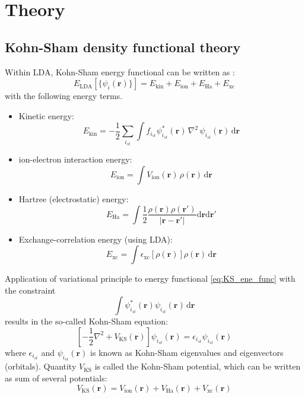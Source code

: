 \section{Theory}

\subsection{Kohn-Sham density functional theory}

Within LDA, Kohn-Sham energy functional can be written as \cite{Kohn1965}:
\begin{equation}
E_{\mathrm{LDA}}\left[\{\psi_{i}(\mathbf{r})\}\right] =
E_{\mathrm{kin}} + E_{\mathrm{ion}} + E_{\mathrm{Ha}} + E_{\mathrm{xc}}
\label{eq:KS_ene_func}
\end{equation}
with the following energy terms.
\begin{itemize}
\item Kinetic energy:
\begin{equation}
E_{\mathrm{kin}} = -\frac{1}{2}\sum_{i_{st}}
\int f_{i_{st}}
\psi_{i_{st}}^{*}(\mathbf{r})\,\nabla^2\,\psi_{i_{st}}(\mathbf{r})
\,\mathrm{d}\mathbf{r}
\end{equation}
%
\item ion-electron interaction energy:
\begin{equation}
E_{\mathrm{ion}} = \int V_{\mathrm{ion}}(\mathbf{r})\, \rho(\mathbf{r})\,
\mathrm{d}\mathbf{r}
\end{equation}
%
\item Hartree (electrostatic) energy:
\begin{equation}
E_{\mathrm{Ha}} = \int \frac{1}{2}
\dfrac{\rho(\mathbf{r})\rho(\mathbf{r}')}
{\left|\mathbf{r} - \mathbf{r}'\right|}
\mathrm{d}\mathbf{r}\mathrm{d}\mathbf{r}'
\end{equation}
%
\item Exchange-correlation energy (using LDA):
\begin{equation}
E_{\mathrm{xc}} = \int \epsilon_{\mathrm{xc}}\left[\rho(\mathbf{r})\right]
\rho(\mathbf{r})\,\mathrm{d}\mathbf{r}
\end{equation}
%
\end{itemize}

Application of variational principle to energy functional \ref{eq:KS_ene_func}
with the constraint
\begin{equation}
\int \psi^{*}_{i_{st}}(\mathbf{r}) \psi_{i_{st}}(\mathbf{r})\,\mathrm{d}\mathbf{r}
\end{equation}
results in the so-called Kohn-Sham equation:
\begin{equation}
\left[
-\frac{1}{2}\nabla^2  + V_{\mathrm{KS}}(\mathbf{r})
\right] \psi_{i_{st}}(\mathbf{r}) =
\epsilon_{i_{st}}\psi_{i_{st}}(\mathbf{r})
\end{equation}
where $\epsilon_{i_{st}}$ and $\psi_{i_{st}}(\mathbf{r})$ is known as Kohn-Sham
eigenvalues and eigenvectors (orbitals).
Quantity $V_{\mathrm{KS}}$ is called the Kohn-Sham potential, which can be
written as sum of several potentials:
\begin{equation}
V_{\mathrm{KS}}(\mathbf{r}) = V_{\mathrm{ion}}(\mathbf{r}) + V_{\mathrm{Ha}}(\mathbf{r})
+ V_{\mathrm{xc}}(\mathbf{r})
\label{eq:KS-pot}
\end{equation}

